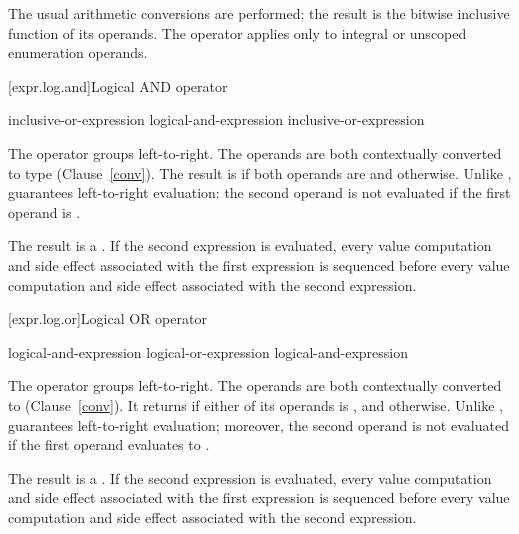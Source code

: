 \pnum
The usual arithmetic conversions are performed; the result is the
bitwise inclusive  function of its operands. The
operator applies only to integral or unscoped enumeration operands.

[expr.log.and]{Logical AND operator}%
%
%
%

\begin{bnf}
\br
    inclusive-or-expression\br
    logical-and-expression \terminal{\&\&} inclusive-or-expression
\end{bnf}

\pnum
The \tcode{\&\&} operator groups left-to-right. The operands are both
contextually converted to type 
(Clause~\ref{conv}). The
result is  if both operands are  and
 otherwise. Unlike \tcode{\&}, \tcode{\&\&} guarantees
left-to-right evaluation: the second operand is not evaluated if the
first operand is .

\pnum
The result is a .
%
If the second expression is evaluated, every
%
value computation and
side
effect associated with the first expression is sequenced before every
value computation and side effect associated with the second expression.

[expr.log.or]{Logical OR operator}%
%
%
%

\begin{bnf}
\br
    logical-and-expression\br
    logical-or-expression \terminal{$||$} logical-and-expression
\end{bnf}

\pnum
The \tcode{$||$} operator groups left-to-right. The operands are both
contextually converted to 
(Clause~\ref{conv}). It returns
 if either of its operands is , and
 otherwise. Unlike \tcode{$|$}, \tcode{$||$} guarantees
left-to-right evaluation; moreover, the second operand is not evaluated
if the first operand evaluates to .

\pnum
The result is a .
%
If the second expression is evaluated, every
%
value computation and
%
side effect
associated with the first expression is sequenced before every value computation
and side effect associated with the second expression.

